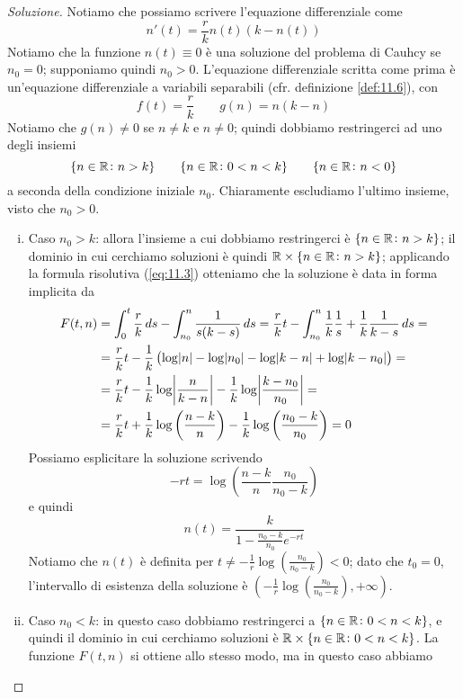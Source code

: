 \begin{proof}[Soluzione]
    Notiamo che possiamo scrivere l'equazione differenziale come
    \[
    n'(t) = \frac{r}{k}n(t)(k-n(t))
    \]
    Notiamo che la funzione $n(t)\equiv 0$ è una soluzione del problema di Cauhcy se $n_0=0$; supponiamo quindi $n_0>0$. L'equazione differenziale scritta come prima è un'equazione differenziale a variabili separabili (cfr. definizione \ref{def:11.6}), con
    \[
    f(t) = \frac{r}{k} \qquad g(n) = n(k-n)
    \]
    Notiamo che $g(n)\ne 0$ se $n\ne k$ e $n\ne 0$; quindi dobbiamo restringerci ad uno degli insiemi
    \[
    \{n\in\amsbb{R}\colon n>k\} \qquad \{n\in\amsbb{R}\colon 0<n<k\} \qquad \{n\in\amsbb{R}\colon n<0\}
    \]
    a seconda della condizione iniziale $n_0$. Chiaramente escludiamo l'ultimo insieme, visto che $n_0>0$. 
    \begin{enumerate}[(i)]
        \item Caso $n_0>k$: allora l'insieme a cui dobbiamo restringerci è $\{n\in\amsbb{R}\colon n>k\}$; il dominio in cui cerchiamo soluzioni è quindi $\amsbb{R}\times \{n\in\amsbb{R} \colon n>k\}$; applicando la formula risolutiva (\ref{eq:11.3}) otteniamo che la soluzione è data in forma implicita da
        \[
        \begin{split}
            F(t,n) &= \int_{0}^t \frac{r}{k}\, ds -\int_{n_0}^n \frac{1}{s(k-s)}\, ds = \frac{r}{k}t-\int_{n_0}^n \frac{1}{k}\frac{1}{s} +\frac{1}{k}\frac{1}{k-s}\, ds = \\
            & = \frac{r}{k}t-\frac{1}{k}\left(\log\abs{n}-\log\abs{n_0}-\log\abs{k-n}+\log\abs{k-n_0}\right) = \\
            & = \frac{r}{k}t -\frac{1}{k}\log\abs{\frac{n}{k-n}}-\frac{1}{k}\log\abs{\frac{k-n_0}{n_0}} = \\
            & = \frac{r}{k}t+\frac{1}{k}\log\left(\frac{n-k}{n}\right)-\frac{1}{k}\log\left(\frac{n_0-k}{n_0}\right) =0
        \end{split}
        \]
        Possiamo esplicitare la soluzione scrivendo
        \[
        -rt = \log\left(\frac{n-k}{n}\frac{n_0}{n_0-k}\right)
        \]
        e quindi
        \[
        n(t) = \frac{k}{1-\frac{n_0-k}{n_0}e^{-rt}}
        \]
        Notiamo che $n(t)$ è definita per $t\ne -\frac{1}{r}\log\left(\frac{n_0}{n_0-k}\right)<0$; dato che $t_0=0$, l'intervallo di esistenza della soluzione è $\left(-\frac{1}{r}\log\left(\frac{n_0}{n_0-k}\right), +\infty\right)$.
        \item Caso $n_0<k$: in questo caso dobbiamo restringerci a $\{n\in\amsbb{R}\colon 0<n<k\}$, e quindi il dominio in cui cerchiamo soluzioni è $\amsbb{R}\times \{n\in\amsbb{R}\colon 0<n<k\}$. La funzione $F(t,n)$ si ottiene allo stesso modo, ma in questo caso abbiamo

\end{enumerate}
\end{proof}
